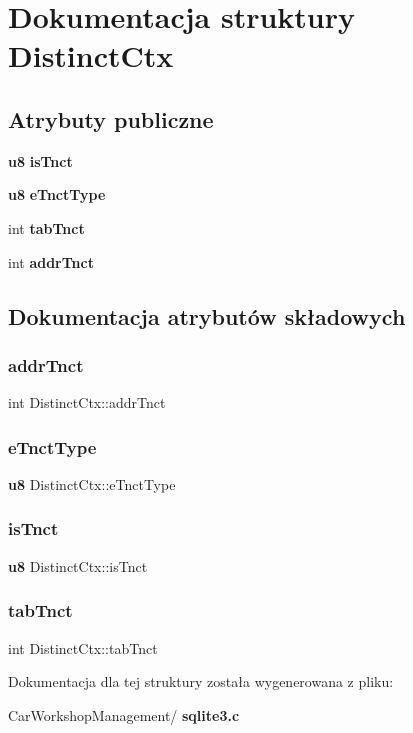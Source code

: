 \section{Dokumentacja struktury Distinct\+Ctx}
\label{struct_distinct_ctx}
\subsection*{Atrybuty publiczne}
\begin{DoxyCompactItemize}
\item 
\textbf{ u8} \textbf{ is\+Tnct}
\item 
\textbf{ u8} \textbf{ e\+Tnct\+Type}
\item 
int \textbf{ tab\+Tnct}
\item 
int \textbf{ addr\+Tnct}
\end{DoxyCompactItemize}


\subsection{Dokumentacja atrybutów składowych}
\mbox{\label{struct_distinct_ctx_a897fdd9a1025f3d6c438a5113cf925d2}} 
\subsubsection{addrTnct}
{\footnotesize\ttfamily int Distinct\+Ctx\+::addr\+Tnct}

\mbox{\label{struct_distinct_ctx_ae57f819b64420f943f21d8d0e9c36205}} 
\subsubsection{eTnctType}
{\footnotesize\ttfamily \textbf{ u8} Distinct\+Ctx\+::e\+Tnct\+Type}

\mbox{\label{struct_distinct_ctx_aaaa3b23ad86358ba11b4da77cd753bbd}} 
\subsubsection{isTnct}
{\footnotesize\ttfamily \textbf{ u8} Distinct\+Ctx\+::is\+Tnct}

\mbox{\label{struct_distinct_ctx_af4514e425f99659e97b2bbe756716517}} 
\subsubsection{tabTnct}
{\footnotesize\ttfamily int Distinct\+Ctx\+::tab\+Tnct}



Dokumentacja dla tej struktury została wygenerowana z pliku\+:\begin{DoxyCompactItemize}
\item 
Car\+Workshop\+Management/\textbf{ sqlite3.\+c}\end{DoxyCompactItemize}
